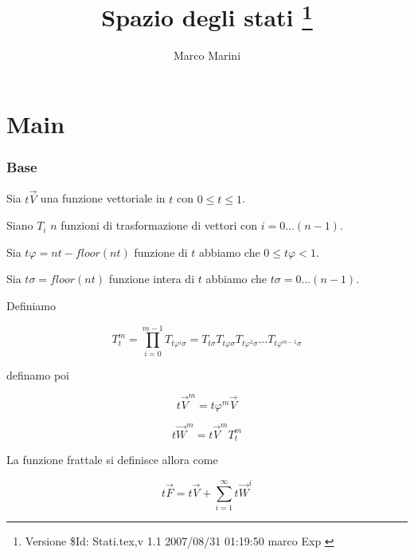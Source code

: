 \documentclass{article}
\begin{document}
  \title{Spazio degli stati \thanks{Versione \$Id: Stati.tex,v 1.1 2007/08/31 01:19:50 marco Exp $ $}}
  \author{Marco Marini}
  \maketitle
  \part{Main}
  \section{Base}
  
  Sia $t\vec{V}$ una funzione vettoriale in $t$ con $0\le t\le 1$.
  
  Siano $T_i$ $n$ funzioni di trasformazione di vettori con $i=0 \dots (n-1)$.
  
  Sia $t\varphi=nt-floor(nt)$ funzione di $t$ abbiamo che $0\le t\varphi< 1$.
  
  Sia $t\sigma=floor(nt)$ funzione intera di $t$ abbiamo che $t\sigma=0\dots(n-1)$.
  
  Definiamo
  
  \begin{equation}
    T^m_t=\prod_{i=0}^{m-1}T_{t\varphi^i\sigma}
    =T_{t\sigma}T_{t\varphi\sigma}T_{t\varphi^2\sigma}\dots T_{t\varphi^{m-1}\sigma}
  \end{equation}
  
  definamo poi

  \begin{equation}
    t\vec{V}^m=t\varphi^m\vec V
  \end{equation}

  \begin{equation}
    t\vec{W}^m=t\vec{V}^mT^m_t
  \end{equation}

  La funzione frattale si definisce allora come

  \begin{equation}
    t\vec F=t\vec V + \sum_{i=1}^\infty t\vec W^i
  \end{equation}
\end{document}
